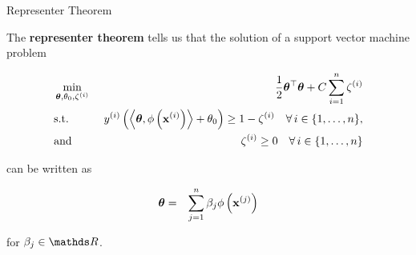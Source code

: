 \documentclass[11pt,compress,t,notes=noshow, xcolor=table]{beamer}
\begin{document}
\begin{vbframe}{Representer Theorem}

The \textbf{representer theorem} tells us that the solution of a support vector machine problem 

\vspace*{-0.5cm}

\begin{eqnarray*}
  & \min\limits_{\bm{\theta}, \theta_0,\zeta^{(i)}} & \frac{1}{2} \bm{\theta}^\top \bm{\theta} + C   \sum_{i=1}^n \zeta^{(i)} \\
  & \text{s.t.} & \,\, y^{(i)}  \left( \left\langle \bm{\theta}, \phi\left(\mathbf{x}^{(i)}\right) \right\rangle + \theta_0 \right) \geq 1 - \zeta^{(i)} \quad \forall\, i \in \{1, \ldots, n\},\\
  & \text{and} & \,\, \zeta^{(i)} \geq 0 \quad \forall\, i \in \{1, \ldots, n\}\\
\end{eqnarray*}

\vspace*{-0.5cm}

can be written as 

\begin{eqnarray*}
  \bm{\theta} &=& \sum_{j = 1}^n \beta_j \phi\left(\mathbf{x}^{(j)}\right)
  \end{eqnarray*}

for $\beta_j \in \R$. 

\end{vbframe}
\end{document}
